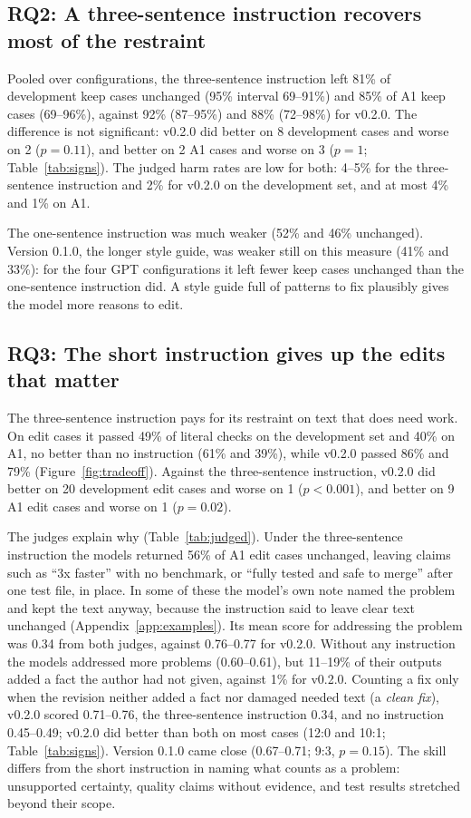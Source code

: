 \documentclass[11pt]{article}
\begin{document}
\subsection{RQ2: A three-sentence instruction recovers most of the restraint}

Pooled over configurations, the three-sentence instruction left 81\% of development keep
cases unchanged (95\% interval 69--91\%) and 85\% of A1 keep cases (69--96\%), against 92\%
(87--95\%) and 88\% (72--98\%) for v0.2.0. The difference is not significant: v0.2.0 did
better on 8 development cases and worse on 2 ($p=0.11$), and better on 2 A1 cases and worse
on 3 ($p=1$; Table~\ref{tab:signs}). The judged harm rates are low for both: 4--5\% for the
three-sentence instruction and 2\% for v0.2.0 on the development set, and at most 4\% and
1\% on A1.

The one-sentence instruction was much weaker (52\% and 46\% unchanged). Version 0.1.0, the
longer style guide, was weaker still on this measure (41\% and 33\%): for the four GPT
configurations it left fewer keep cases unchanged than the one-sentence instruction did.
A style guide full of patterns to fix plausibly gives the model more reasons to edit.

\subsection{RQ3: The short instruction gives up the edits that matter}

The three-sentence instruction pays for its restraint on text that does need work. On
edit cases it passed 49\% of literal checks on the development set and 40\% on A1, no better
than no instruction (61\% and 39\%), while v0.2.0 passed 86\% and 79\%
(Figure~\ref{fig:tradeoff}). Against the three-sentence instruction, v0.2.0 did better on
20 development edit cases and worse on 1 ($p<0.001$), and better on 9 A1 edit cases and
worse on 1 ($p=0.02$).

The judges explain why (Table~\ref{tab:judged}). Under the three-sentence instruction the
models returned 56\% of A1 edit cases unchanged, leaving claims such as ``3x faster'' with
no benchmark, or ``fully tested and safe to merge'' after one test file, in place. In
some of these the model's own note named the problem and kept the text anyway, because the
instruction said to leave clear text unchanged (Appendix~\ref{app:examples}). Its mean
score for addressing the problem was 0.34 from both judges, against 0.76--0.77 for v0.2.0.
Without any instruction the models addressed more problems (0.60--0.61), but 11--19\% of
their outputs added a fact the author had not given, against 1\% for v0.2.0. Counting a
fix only when the revision neither added a fact nor damaged needed text (a \emph{clean
fix}), v0.2.0 scored 0.71--0.76, the three-sentence instruction 0.34, and no instruction
0.45--0.49; v0.2.0 did better than both on most cases (12:0 and 10:1;
Table~\ref{tab:signs}). Version 0.1.0 came close (0.67--0.71; 9:3, $p=0.15$). The skill
differs from the short instruction in naming what counts as a problem: unsupported
certainty, quality claims without evidence, and test results stretched beyond their
scope.
\end{document}
